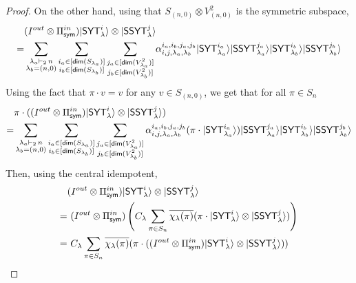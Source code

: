 \documentclass[11pt]{article}
\DeclarePairedDelimiter\ket{\lvert}{\rangle}
\begin{document}
\begin{proof}
    On the other hand, using that $S_{(n,0)}\otimes V^2_{(n,0)} $ is the symmetric subspace,
    \begin{align*}
    &(I^{out}\otimes \Pi_{\mathsf{sym}}^{in}) \ket{\mathsf{SYT}_{\lambda}^{i}}\otimes \ket{\mathsf{SSYT}_{\lambda}^{j}}\\
    = &\sum_{\substack{\lambda_a \vdash_2\, n \\ \lambda_b=(n,0)}} \sum_{\substack{i_a \in [\mathsf{dim}(S_{\lambda_a})] \\i_b \in [\mathsf{dim}(S_{\lambda_b})]}}  \sum_{\substack{j_a \in [\mathsf{dim}(V^2_{\lambda_a})] \\j_b \in [\mathsf{dim}(V^2_{\lambda_b})]}}\alpha_{i, j, \lambda_a, \lambda_b}^{i_a, i_b, j_a, j_b} \ket{\mathsf{SYT}_{\lambda_a}^{i_a}} \ket{\mathsf{SSYT}_{\lambda_a}^{j_a}} \ket{\mathsf{SYT}_{\lambda_b}^{i_b}} \ket{\mathsf{SSYT}_{\lambda_b}^{j_b}}
    \end{align*}
    Using the fact that $\pi\cdot v=v$ for any $v\in S_{(n,0)}$, we get that for all $\pi \in S_n$
    \begin{align*}
    &\pi \cdot ((I^{out}\otimes \Pi_{\mathsf{sym}}^{in}) \ket{\mathsf{SYT}_{\lambda}^{i}}\otimes \ket{\mathsf{SSYT}_{\lambda}^{j}})\\
    = &\sum_{\substack{\lambda_a \vdash_2\, n \\ \lambda_b=(n,0)}} \sum_{\substack{i_a \in [\mathsf{dim}(S_{\lambda_a})] \\i_b \in [\mathsf{dim}(S_{\lambda_b})]}}  \sum_{\substack{j_a \in [\mathsf{dim}(V^2_{\lambda_a})] \\j_b \in [\mathsf{dim}(V^2_{\lambda_b})]}}\alpha_{i, j, \lambda_a, \lambda_b}^{i_a, i_b, j_a, j_b} (\pi \cdot \ket{\mathsf{SYT}_{\lambda_a}^{i_a}}) \ket{\mathsf{SSYT}_{\lambda_a}^{j_a}} \ket{\mathsf{SYT}_{\lambda_b}^{i_b}} \ket{\mathsf{SSYT}_{\lambda_b}^{j_b}}
    \end{align*}
Then, using the central idempotent,
    \begin{align*}
    &(I^{out}\otimes \Pi_{\mathsf{sym}}^{in})\ket{\mathsf{SYT}_{\lambda}^{i}}\otimes \ket{\mathsf{SSYT}_{\lambda}^{j}} \\
    =&~(I^{out}\otimes \Pi_{\mathsf{sym}}^{in})\left(C_{\lambda}\sum_{\pi\in S_n} \overline{\chi_{\lambda}(\pi)}( \pi\cdot \ket{\mathsf{SYT}_{\lambda}^{i}}\otimes \ket{\mathsf{SSYT}_{\lambda}^{j}})\right) \\
    =&~C_{\lambda}\sum_{\pi\in S_n} \overline{\chi_{\lambda}(\pi)}( \pi\cdot((I^{out}\otimes \Pi_{\mathsf{sym}}^{in}) \ket{\mathsf{SYT}_{\lambda}^{i}}\otimes \ket{\mathsf{SSYT}_{\lambda}^{j}})  ) \\

\end{align*}
\end{proof}
\end{document}
